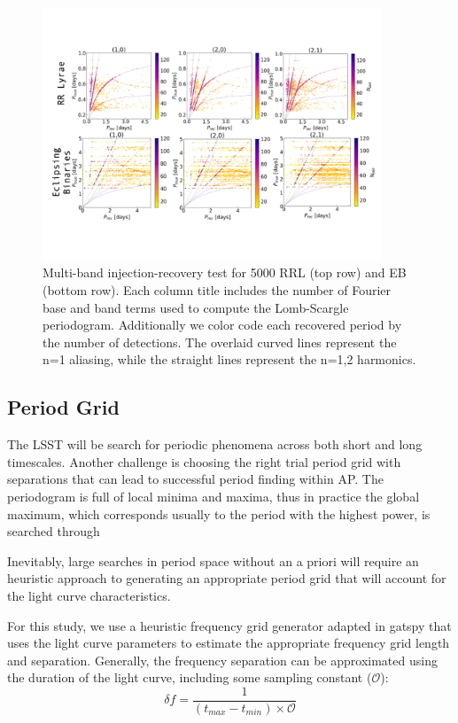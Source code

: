 \documentclass[DM,authoryear,toc]{lsstdoc}
\begin{document}
\begin{figure}
  \includegraphics[width=0.9\textwidth]{figures/multi_lsp_rectest.pdf}
  \centering 
  \caption{Multi-band injection-recovery test for 5000 RRL (top row) and EB (bottom row). Each column title includes the number of Fourier base and band terms used to compute the Lomb-Scargle periodogram. Additionally we color code each recovered period by the number of detections. The overlaid curved lines represent the n=1 aliasing, while the straight lines represent the n=1,2 harmonics.}
\end{figure}

\subsection{Period Grid}
The LSST will be search for periodic phenomena across both short and long timescales. Another challenge is choosing the right trial period grid with separations that can lead to successful period finding within AP. The periodogram is full of local minima and maxima, thus in practice the global maximum, which corresponds usually to the period with the highest power, is searched through 

Inevitably, large searches in period space without an a priori will require an heuristic approach to generating an appropriate period grid that will account for the light curve characteristics. 

For this study, we use a heuristic frequency grid generator adapted in gatspy that uses the light curve parameters to estimate the appropriate frequency grid length and separation. Generally, the frequency separation can be approximated using the duration of the light curve, including some sampling constant ($\mathcal{O}$):
\begin{equation}
\delta f = \frac{1}{(t_{max} - t_{min}) \times \mathcal{O}}
\end{equation}
\end{document}
